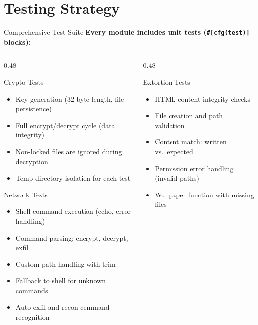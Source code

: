 \documentclass[aspectratio=169]{beamer}
\newcommand{\code}[1]{\texttt{\textcolor{primaryblue}{#1}}}
\begin{document}
\section{Testing Strategy}

\begin{frame}{Comprehensive Test Suite}
  \textbf{Every module includes unit tests (\code{\#[cfg(test)]} blocks):}

  \vspace{0.5em}
  \begin{columns}[T]
    \begin{column}{0.48\textwidth}
      \begin{block}{Crypto Tests}
        \footnotesize
        \begin{itemize}
          \item Key generation (32-byte length, file persistence)
          \item Full encrypt/decrypt cycle (data integrity)
          \item Non-locked files are ignored during decryption
          \item Temp directory isolation for each test
        \end{itemize}
      \end{block}

      \vspace{0.3em}
      \begin{block}{Network Tests}
        \footnotesize
        \begin{itemize}
          \item Shell command execution (echo, error handling)
          \item Command parsing: encrypt, decrypt, exfil
          \item Custom path handling with trim
          \item Fallback to shell for unknown commands
          \item Auto-exfil and recon command recognition
        \end{itemize}
      \end{block}
    \end{column}
    \begin{column}{0.48\textwidth}
      \begin{block}{Extortion Tests}
        \footnotesize
        \begin{itemize}
          \item HTML content integrity checks
          \item File creation and path validation
          \item Content match: written vs.\ expected
          \item Permission error handling (invalid paths)
          \item Wallpaper function with missing files
        \end{itemize}
      \end{block}


\end{column}
\end{columns}
\end{frame}
\end{document}

